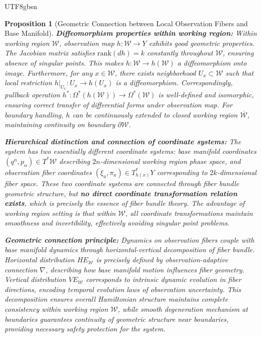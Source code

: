 \documentclass[a4paper,12pt]{extarticle}
\newtheorem{proposition}[theorem]{Proposition}
\theoremstyle{definition}
\begin{document}
\begin{CJK}{UTF8}{gbsn}
\begin{proposition}[Geometric Connection between Local Observation Fibers and Base Manifold]
\textbf{Diffeomorphism properties within working region:}
Within working region $\mathcal{W}$, observation map $h: \mathcal{W} \to Y$ exhibits good geometric properties. The Jacobian matrix satisfies $\text{rank}(dh) = k$ constantly throughout $\mathcal{W}$, ensuring absence of singular points. This makes $h: \mathcal{W} \to h(\mathcal{W})$ a diffeomorphism onto image. Furthermore, for any $x \in \mathcal{W}$, there exists neighborhood $U_x \subset \mathcal{W}$ such that local restriction $h|_{U_x}: U_x \to h(U_x)$ is a diffeomorphism. Correspondingly, pullback operation $h^*: \Omega^*(h(\mathcal{W})) \to \Omega^*(\mathcal{W})$ is well-defined and isomorphic, ensuring correct transfer of differential forms under observation map. For boundary handling, $h$ can be continuously extended to closed working region $\overline{\mathcal{W}}$, maintaining continuity on boundary $\partial \mathcal{W}$.

\textbf{Hierarchical distinction and connection of coordinate systems:}
The system has two essentially different coordinate systems: base manifold coordinates $(q^\alpha, p_\alpha) \in T^*\mathcal{W}$ describing $2n$-dimensional working region phase space, and observation fiber coordinates $(\xi_a, \pi_a) \in T^*_{h(x)}Y$ corresponding to $2k$-dimensional fiber space. These two coordinate systems are connected through fiber bundle geometric structure, but \textbf{no direct coordinate transformation relation exists}, which is precisely the essence of fiber bundle theory. The advantage of working region setting is that within $\mathcal{W}$, all coordinate transformations maintain smoothness and invertibility, effectively avoiding singular point problems.

\textbf{Geometric connection principle:}
Dynamics on observation fibers couple with base manifold dynamics through horizontal-vertical decomposition of fiber bundle. Horizontal distribution $H E_{\mathcal{W}}$ is precisely defined by observation-adaptive connection $\nabla$, describing how base manifold motion influences fiber geometry. Vertical distribution $V E_{\mathcal{W}}$ corresponds to intrinsic dynamic evolution in fiber directions, encoding temporal evolution laws of observation uncertainty. This decomposition ensures overall Hamiltonian structure maintains complete consistency within working region $\mathcal{W}$, while smooth degeneration mechanism at boundaries guarantees continuity of geometric structure near boundaries, providing necessary safety protection for the system.


\end{proposition}
\end{CJK}
\end{document}

